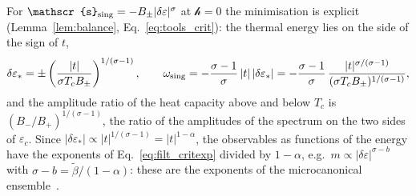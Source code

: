 \documentclass[10pt,a4paper]{article}
\theoremstyle{plain}
\newcommand{\hfield}{\mathscr{h}}  %
\newcommand{\lds}{\mathscr{s}}  %
\begin{document}
For $\lds_{\rm sing}=-B_\pm|\delta\varepsilon|^{\sigma}$ at $\hfield=0$ the
minimisation is explicit (Lemma~\ref{lem:balance},
Eq.~\eqref{eq:tools_crit}): the thermal energy lies on the side of the sign
of $t$,
\begin{equation}\label{eq:filt_omexpl}
  \delta\varepsilon_*=\pm\left(\frac{|t|}{\sigma T_cB_\pm}\right)^{1/(\sigma-1)} ,
  \qquad
  \omega_{\rm sing}=-\frac{\sigma-1}{\sigma}\,|t|\,|\delta\varepsilon_*|
  =-\frac{\sigma-1}{\sigma}\,\frac{|t|^{\sigma/(\sigma-1)}}{(\sigma T_cB_\pm)^{1/(\sigma-1)}} ,
\end{equation}
and the amplitude ratio of the heat capacity above and below $T_c$ is
$(B_-/B_+)^{1/(\sigma-1)}$, the ratio of the amplitudes of the spectrum on
the two sides of $\varepsilon_c$. Since
$|\delta\varepsilon_*|\propto|t|^{1/(\sigma-1)}=|t|^{1-\alpha}$, the
observables as functions of the energy have the exponents of
Eq.~\eqref{eq:filt_critexp} divided by $1-\alpha$, e.g.\
$m\propto|\delta\varepsilon|^{\sigma-b}$ with
$\sigma-b=\tilde\beta/(1-\alpha)$: these are the exponents of the
microcanonical ensemble~\cite{Kastner2000}.
\end{document}
